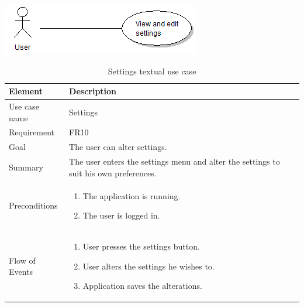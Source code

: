 \begin{table}
\begin{center}
\begin{center}
\includegraphics[width=\textwidth]{settings}
\end{center}
\begin{tabular}{p{3cm}|p{12cm}} \hline
\textbf{Element} & \textbf{Description} \\ \hline \hline
Use case name & Settings \\ 
Requirement & FR10 \\
Goal & The user can alter settings. \\ 
Summary & The user enters the settings menu and alter the settings to suit his own preferences. \\
Preconditions &
\begin{enumerate}
\item{}The application is running.
\item{}The user is logged in.
\end{enumerate} \\ \hline
Flow of Events &
\begin{enumerate}
\item{}User presses the settings button.
\item{}User alters the settings he wishes to.
\item{}Application saves the alterations.
\end{enumerate} \\ \hline
\end{tabular}
\end{center}
\caption{Settings textual use case} \label{tab:settings}
\end{table}
